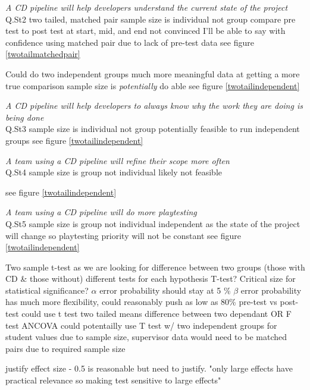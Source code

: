 \documentclass[lettersize,journal]{IEEEtran}
\begin{document}
        \textit{A CD pipeline will help developers understand the current state of the project} \\
            Q.St2
            two tailed, matched pair
            sample size is individual not group
            compare pre test to post test at start, mid, and end
            not convinced I'll be able to say with confidence using matched pair due to lack of pre-test data
            see figure \ref{twotailmatchedpair}

            Could do two independent groups
            much more meaningful data at getting a more true comparison
            sample size is \textit{potentially} do able
            see figure \ref{twotailindependent}


        \textit{A CD pipeline will help developers to always know why the work they are doing is being done} \\
            Q.St3
            sample size is individual not group
            potentially feasible to run independent groups
            see figure \ref{twotailindependent}

        \textit{A team using a CD pipeline will refine their scope more often} \\
            Q.St4
            sample size is group not individual
            likely not feasible

            see figure \ref{twotailindependent}

        \textit{A team using a CD pipeline will do more playtesting} \\
            Q.St5
            sample size is group not individual
            independent as the state of the project will change so playtesting priority will not be constant
            see figure \ref{twotailindependent}
    
        Two sample t-test as we are looking for difference between two groups (those with CD \& those without)
        different tests for each hypothesis
        T-test? Critical size for statistical significance?
        $\alpha$ error probability should stay at 5 \%
        $\beta$ error probability has much more flexibility, could reasonably push as low as 80\%
        pre-test vs post-test could use t test two tailed means difference between two dependant OR F test ANCOVA
        could potentailly use T test w/ two independent groups for student values due to sample size, supervisor data would need to be matched pairs due to required sample size

        justify effect size - 0.5 is reasonable but need to justify. "only large effects have practical relevance so making test sensitive to large effects"
\end{document}
